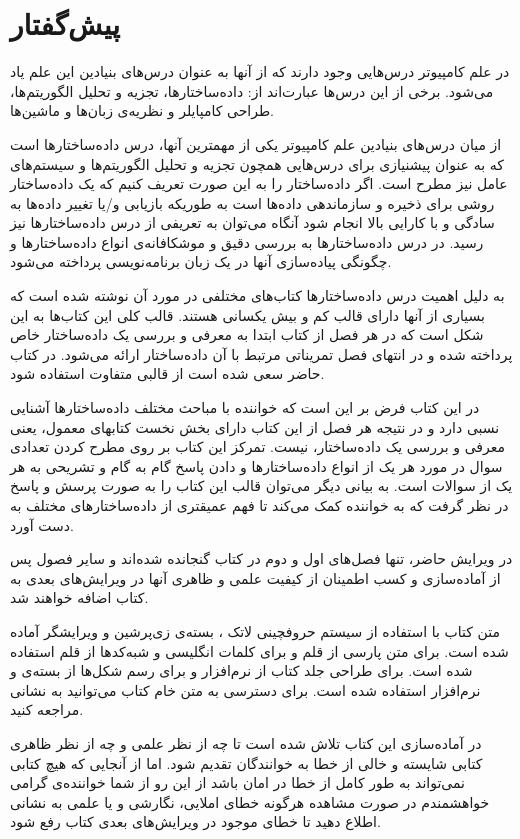 \section*{پیش‌گفتار}
در علم کامپیوتر درس‌هایی وجود دارند که از آنها به عنوان درس‌های بنیادین این علم یاد می‌شود. برخی از این درس‌ها عبارت‌اند از: داده‌ساختارها، تجزیه و تحلیل الگوریتم‌ها، طراحی کامپایلر و نظریه‌ی زبان‌ها و ماشین‌ها.

از میان درس‌های بنیادین علم کامپیوتر یکی از مهمترین آنها، درس داده‌ساختارها است که به عنوان پیشنیازی برای درس‌هایی همچون تجزیه و تحلیل الگوریتم‌ها و سیستم‌های عامل نیز مطرح است. اگر داده‌ساختار را به این صورت تعریف کنیم که {\prq}یک داده‌ساختار روشی برای ذخیره و سازماندهی داده‌ها است به طوریکه بازیابی و/یا تغییر داده‌ها به سادگی و با کارایی بالا انجام شود{\plq} آنگاه می‌توان به تعریفی از درس داده‌ساختارها نیز رسید. در درس داده‌ساختارها به بررسی دقیق و موشکافانه‌ی انواع داده‌ساختارها و چگونگی پیاده‌سازی آنها در یک زبان برنامه‌نویسی پرداخته می‌شود.

به دلیل اهمیت درس داده‌ساختارها کتاب‌های مختلفی در مورد آن نوشته شده است که بسیاری از آنها دارای قالب کم و بیش یکسانی هستند. قالب کلی این کتاب‌ها به این شکل است که در هر فصل از کتاب ابتدا به معرفی و بررسی یک داده‌ساختار خاص پرداخته شده و در انتهای فصل تمریناتی مرتبط با آن داده‌ساختار ارائه می‌شود. در کتاب حاضر سعی شده است از قالبی متفاوت استفاده شود.

در این کتاب فرض بر این است که خواننده با مباحث مختلف داده‌ساختارها آشنایی نسبی دارد و در نتیجه هر فصل از این کتاب دارای بخش نخست کتابهای معمول، یعنی معرفی و بررسی یک داده‌ساختار، نیست. تمرکز این کتاب بر روی مطرح کردن تعدادی سوال در مورد هر یک از انواع داده‌ساختارها و دادن پاسخ گام به گام و تشریحی به هر یک از سوالات است. به بیانی دیگر می‌توان قالب این کتاب را به صورت پرسش و پاسخ در نظر گرفت که به خواننده کمک می‌کند تا فهم عمیقتری از داده‌ساختارهای مختلف به دست آورد.

در ویرایش حاضر، تنها فصل‌های اول و دوم در کتاب گنجانده شده‌اند و سایر فصول پس از آماده‌سازی و کسب اطمینان از کیفیت علمی و ظاهری آنها در ویرایش‌های بعدی به کتاب اضافه خواهند شد.

متن کتاب با استفاده از سیستم حروفچینی لاتک ، بسته‌ی زی‌پرشین و ویرایشگر {} آماده شده است. برای متن پارسی از قلم {} و برای کلمات انگلیسی و شبه‌کدها از قلم {} استفاده شده است. برای طراحی جلد کتاب از نرم‌افزار {} و برای رسم شکل‌ها از بسته‌ی {} و نرم‌افزار {} استفاده شده است. برای دسترسی به متن خام کتاب می‌توانید به نشانی {} مراجعه کنید.

در آماده‌سازی این کتاب تلاش شده است تا چه از نظر علمی و چه از نظر ظاهری کتابی شایسته و خالی از خطا به خوانندگان تقدیم شود. اما از آنجایی که هیچ کتابی نمی‌تواند به طور کامل از خطا در امان باشد از این رو از شما خواننده‌ی گرامی خواهشمندم در صورت مشاهده هرگونه خطای املایی، نگارشی و یا علمی به نشانی
{} اطلاع دهید تا خطای موجود در ویرایش‌های بعدی کتاب رفع شود.

\begin{flushleft}
\small
\author\\
\date
\end{flushleft}
\newpage